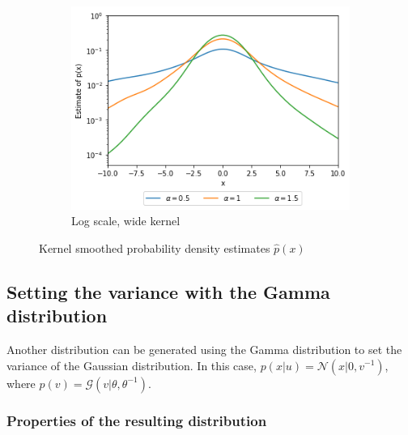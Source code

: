 \documentclass[a4paper]{article}
\begin{document}
\begin{figure}[h]
    \hfill
    \begin{subfigure}[b]{0.3\textwidth}
        \centering
        \includegraphics[width=\textwidth]{figures/exponential_sampled_gaussian_kernel_smoothed_log_wide.png}
        \caption{Log scale, wide kernel}
        \label{fig:exponential_sampled_gaussian_kernel_smoothed_log_wide}
    \end{subfigure}
    \caption{Kernel smoothed probability density estimates $\hat{p}(x)$}
    \label{fig:exponential_sampled_gaussian_kernel_smoothed}
\end{figure}


\subsection{Setting the variance with the Gamma distribution}

Another distribution can be generated using the Gamma distribution to set the variance of the Gaussian distribution.
In this case, $p(x|u) = \mathcal{N}(x|0, v^{-1})$, where $p(v) = \mathcal{G}(v|\theta, \theta^{-1})$.

\subsubsection{Properties of the resulting distribution}
\end{document}
